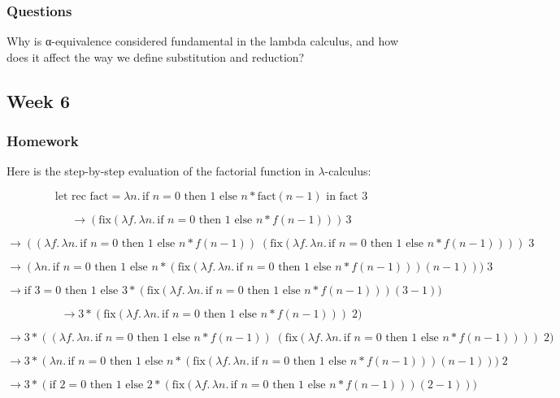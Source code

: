 \documentclass{article}
\theoremstyle{theorem}
\theoremstyle{definition}
\theoremstyle{remark}
\begin{document}
\subsubsection{Questions}

Why is α-equivalence considered fundamental in the lambda calculus, and how does it affect the way we define substitution and reduction?


\subsection{Week 6}

\subsubsection{Homework}

Here is the step-by-step evaluation of the factorial function in $\lambda$-calculus:

\[
\text{let rec fact} = \lambda n.\, \text{if } n=0 \text{ then } 1 \text{ else } n * \text{fact}(n-1) \text{ in fact } 3
\]

\[
\to (\text{fix}(\lambda f.\, \lambda n.\, \text{if } n=0 \text{ then } 1 \text{ else } n * f(n-1)))\, 3
\]

\[
\to ((\lambda f.\, \lambda n.\, \text{if } n=0 \text{ then } 1 \text{ else } n * f(n-1)) \; (\text{fix}(\lambda f.\, \lambda n.\, \text{if } n=0 \text{ then } 1 \text{ else } n * f(n-1)))) \; 3
\]

\[
\to (\lambda n.\, \text{if } n=0 \text{ then } 1 \text{ else } n * (\text{fix}(\lambda f.\, \lambda n.\, \text{if } n=0 \text{ then } 1 \text{ else } n * f(n-1))) (n-1))) \; 3
\]

\[
\to \text{if } 3=0 \text{ then } 1 \text{ else } 3 * (\text{fix}(\lambda f.\, \lambda n.\, \text{if } n=0 \text{ then } 1 \text{ else } n * f(n-1))) (3-1))
\]

\[
\to 3 * (\text{fix}(\lambda f.\, \lambda n.\, \text{if } n=0 \text{ then } 1 \text{ else } n * f(n-1))) \; 2)
\]

\[
\to 3 * ((\lambda f.\, \lambda n.\, \text{if } n=0 \text{ then } 1 \text{ else } n * f(n-1)) \; (\text{fix}(\lambda f.\, \lambda n.\, \text{if } n=0 \text{ then } 1 \text{ else } n * f(n-1)))) \; 2)
\]

\[
\to 3 * (\lambda n.\, \text{if } n=0 \text{ then } 1 \text{ else } n * (\text{fix}(\lambda f.\, \lambda n.\, \text{if } n=0 \text{ then } 1 \text{ else } n * f(n-1))) (n-1))) \; 2
\]

\[
\to 3 * (\text{if } 2=0 \text{ then } 1 \text{ else } 2 * (\text{fix}(\lambda f.\, \lambda n.\, \text{if } n=0 \text{ then } 1 \text{ else } n * f(n-1))) (2-1)))
\]
\end{document}
